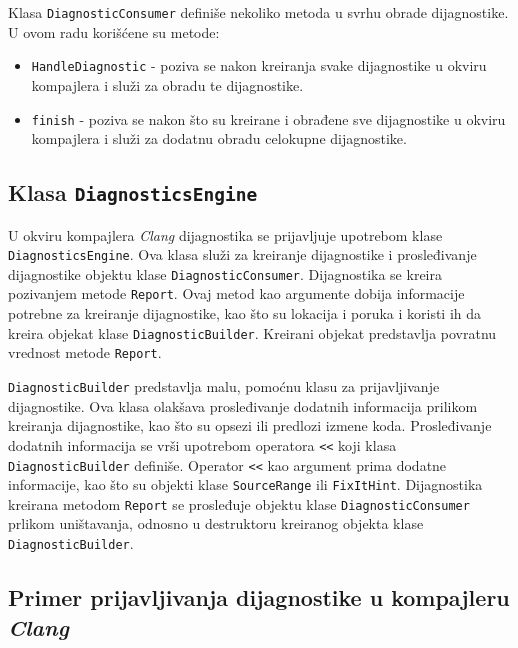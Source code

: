 \documentclass[12pt,oneside]{memoir}
\begin{document}
Klasa \texttt{DiagnosticConsumer} defini\v{s}e nekoliko metoda u svrhu obrade dijagnostike. U ovom radu kori\v{s}\'{c}ene su metode:
\begin{itemize}
\item \texttt{HandleDiagnostic} - poziva se nakon kreiranja svake dijagnostike u okviru kompajlera i slu\v{z}i za obradu te dijagnostike. 
\item \texttt{finish} - poziva se nakon \v{s}to su kreirane i obrađene sve dijagnostike u okviru kompajlera i slu\v{z}i za dodatnu obradu celokupne dijagnostike.
\end{itemize}

\subsection{Klasa \texttt{DiagnosticsEngine}}

U okviru kompajlera \textit{Clang} dijagnostika se prijavljuje upotrebom klase \texttt{Diagno\-sticsEngine}. Ova klasa slu\v{z}i 
za kreiranje dijagnostike i prosleđivanje dijagnostike objektu klase \texttt{DiagnosticConsumer}. Dijagnostika se kreira pozivanjem metode \texttt{Report}. Ovaj metod kao argumente dobija informacije potrebne za kreiranje dijagnostike, kao \v{s}to su lokacija i poruka i koristi ih da kreira objekat klase \texttt{DiagnosticBuilder}. Kreirani objekat predstavlja povratnu vrednost metode \texttt{Report}. \par
\texttt{DiagnosticBuilder} predstavlja malu, pomo\'{c}nu klasu za prijavljivanje dijagnostike. Ova klasa olak\v{s}ava prosleđivanje
dodatnih informacija prilikom kreiranja dijagnostike, kao \v{s}to su opsezi ili predlozi izmene koda. Prosleđivanje dodatnih informacija se vr\v{s}i upotrebom operatora \texttt{<<} koji klasa \texttt{DiagnosticBuilder} defini\v{s}e. Operator \texttt{<<} kao argument prima dodatne informacije, kao \v{s}to su objekti klase \texttt{SourceRange} ili \texttt{FixItHint}. Dijagnostika kreirana metodom
\texttt{Report} se prosleđuje objektu klase \texttt{DiagnosticConsumer} prlikom uni\v{s}tavanja, odnosno u destruktoru kreiranog objekta klase \texttt{DiagnosticBuilder}. 


\subsection{Primer prijavljivanja dijagnostike u kompajleru \textit{Clang}}
\end{document}
